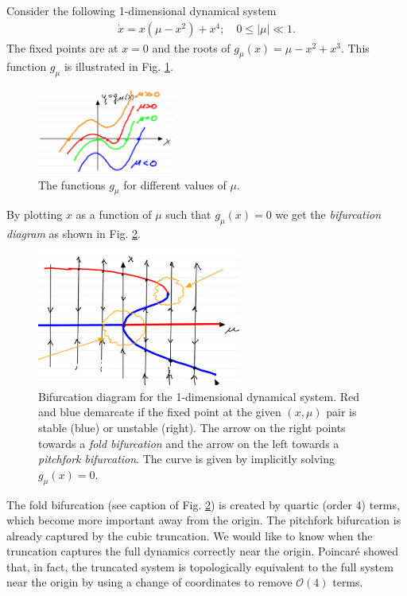 \begin{ex}
	Consider the following 1-dimensional dynamical system
	\begin{align}
		\dot{x}=x(\mu -x^2)+x^4;\quad 0 \leq| \mu| \ll 1.
	\end{align}
	The fixed points are at $x=0$ and the roots of $g_\mu (x) = \mu -x^2 + x^3$. This function $g_\mu $ is illustrated in Fig. \ref{fig:gmu_roots}.
	\begin{figure}[h!]
		\centering
		\includegraphics[width=0.4\textwidth]{figures/ch3/7gmu_roots.png}
		\caption{The functions $g_\mu $ for different values of $\mu $.}
		\label{fig:gmu_roots}
	\end{figure}
	By plotting $x$ as a function of $\mu $ such that $g_{\mu }(x)=0$ we get the \emph{bifurcation diagram} as shown in Fig. \ref{fig:gmu_bifurc}.
	\begin{figure}[h!]
		\centering
		\includegraphics[width=0.6\textwidth]{figures/ch3/8gmu_bifurc.png}
		\caption{Bifurcation diagram for the 1-dimensional dynamical system. Red and blue demarcate if the fixed point at the given $(x, \mu)$ pair is stable (blue) or unstable (right). The arrow on the right points towards a \emph{fold bifurcation} and the arrow on the left towards a \emph{pitchfork bifurcation}. The curve is given by implicitly solving $g_{\mu}(x)=0$.}
		\label{fig:gmu_bifurc}
	\end{figure}

	The fold bifurcation (see caption of Fig. \ref{fig:gmu_bifurc}) is created by quartic (order 4) terms, which become more important away from the origin. The pitchfork bifurcation is already captured by the cubic truncation. We would like to know when the truncation captures the full dynamics correctly near the origin. Poincaré showed that, in fact, the truncated system is topologically equivalent to the full system near the origin by using a change of coordinates to remove $\mathcal{O}(4)$ terms.


\end{ex}
